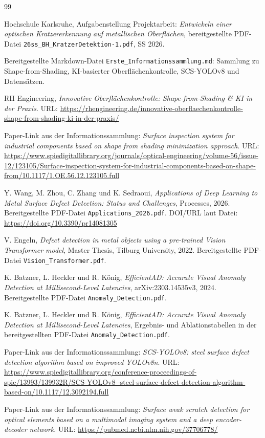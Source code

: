 \documentclass[11pt,a4paper]{article}
\begin{document}
\newpage
\begin{thebibliography}{99}

Hochschule Karlsruhe, Aufgabenstellung Projektarbeit: \emph{Entwickeln einer optischen Kratzererkennung auf metallischen Oberflächen}, bereitgestellte PDF-Datei \texttt{26ss\_BH\_KratzerDetektion-1.pdf}, SS 2026.

Bereitgestellte Markdown-Datei \texttt{Erste\_Informationssammlung.md}: Sammlung zu Shape-from-Shading, KI-basierter Oberflächenkontrolle, SCS-YOLOv8 und Datensätzen.

RH Engineering, \emph{Innovative Oberflächenkontrolle: Shape-from-Shading \& KI in der Praxis}. URL: \url{https://rhengineering.de/innovative-oberflaechenkontrolle-shape-from-shading-ki-in-der-praxis/}

Paper-Link aus der Informationssammlung: \emph{Surface inspection system for industrial components based on shape from shading minimization approach}. URL: \url{https://www.spiedigitallibrary.org/journals/optical-engineering/volume-56/issue-12/123105/Surface-inspection-system-for-industrial-components-based-on-shape-from/10.1117/1.OE.56.12.123105.full}

Y. Wang, M. Zhou, C. Zhang und K. Sedraoui, \emph{Applications of Deep Learning to Metal Surface Defect Detection: Status and Challenges}, Processes, 2026. Bereitgestellte PDF-Datei \texttt{Applications\_2026.pdf}. DOI/URL laut Datei: \url{https://doi.org/10.3390/pr14081305}

V. Engeln, \emph{Defect detection in metal objects using a pre-trained Vision Transformer model}, Master Thesis, Tilburg University, 2022. Bereitgestellte PDF-Datei \texttt{Vision\_Transformer.pdf}.

K. Batzner, L. Heckler und R. König, \emph{EfficientAD: Accurate Visual Anomaly Detection at Millisecond-Level Latencies}, arXiv:2303.14535v3, 2024. Bereitgestellte PDF-Datei \texttt{Anomaly\_Detection.pdf}.

K. Batzner, L. Heckler und R. König, \emph{EfficientAD: Accurate Visual Anomaly Detection at Millisecond-Level Latencies}, Ergebnis- und Ablationstabellen in der bereitgestellten PDF-Datei \texttt{Anomaly\_Detection.pdf}.

Paper-Link aus der Informationssammlung: \emph{SCS-YOLOv8: steel surface defect detection algorithm based on improved YOLOv8n}. URL: \url{https://www.spiedigitallibrary.org/conference-proceedings-of-spie/13993/139932R/SCS-YOLOv8--steel-surface-defect-detection-algorithm-based-on/10.1117/12.3092194.full}

Paper-Link aus der Informationssammlung: \emph{Surface weak scratch detection for optical elements based on a multimodal imaging system and a deep encoder-decoder network}. URL: \url{https://pubmed.ncbi.nlm.nih.gov/37706778/}

\end{thebibliography}
\end{document}

